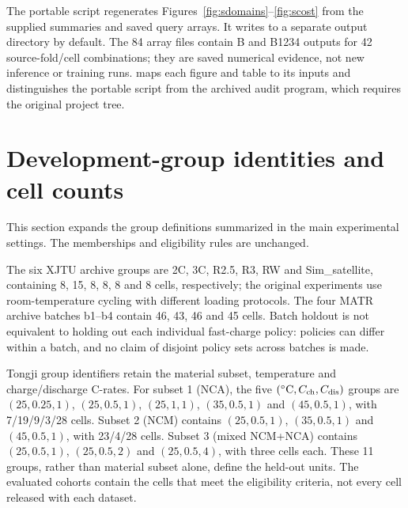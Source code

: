\documentclass[11pt,a4paper]{article}
\begin{document}
The portable  script regenerates Figures~\ref{fig:sdomains}--\ref{fig:scost} from the supplied summaries and saved query arrays. It writes to a separate output directory by default. The 84 array files contain B and B1234 outputs for 42 source-fold/cell combinations; they are saved numerical evidence, not new inference or training runs.  maps each figure and table to its inputs and distinguishes the portable script from the archived audit program, which requires the original project tree.

\FloatBarrier
\section{Development-group identities and cell counts}
\label{sec:sgroups}
This section expands the group definitions summarized in the main experimental settings. The memberships and eligibility rules are unchanged.

The six XJTU archive groups are 2C, 3C, R2.5, R3, RW and Sim\_satellite, containing 8, 15, 8, 8, 8 and 8 cells, respectively; the original experiments use room-temperature cycling with different loading protocols. The four MATR archive batches b1--b4 contain 46, 43, 46 and 45 cells. Batch holdout is not equivalent to holding out each individual fast-charge policy: policies can differ within a batch, and no claim of disjoint policy sets across batches is made.

Tongji group identifiers retain the material subset, temperature and charge/discharge C-rates. For subset 1 (NCA), the five $(^{\circ}\mathrm C, C_{\rm ch}, C_{\rm dis})$ groups are $(25,0.25,1)$, $(25,0.5,1)$, $(25,1,1)$, $(35,0.5,1)$ and $(45,0.5,1)$, with 7/19/9/3/28 cells. Subset 2 (NCM) contains $(25,0.5,1)$, $(35,0.5,1)$ and $(45,0.5,1)$, with 23/4/28 cells. Subset 3 (mixed NCM+NCA) contains $(25,0.5,1)$, $(25,0.5,2)$ and $(25,0.5,4)$, with three cells each. These 11 groups, rather than material subset alone, define the held-out units.
The evaluated cohorts contain the cells that meet the eligibility criteria, not every cell released with each dataset.
\end{document}
